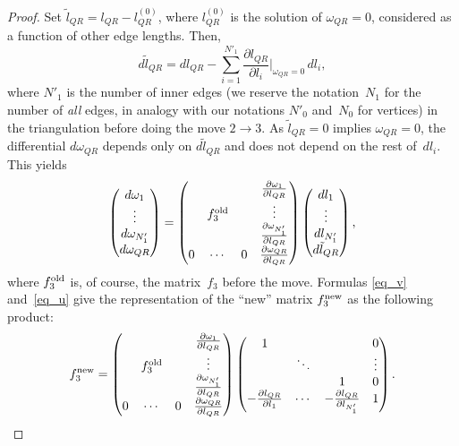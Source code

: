 \documentclass[pdftex]{sigma}
\begin{document}
\begin{proof}
Set $\tilde l_{QR} = l_{QR} - l^{(0)}_{QR}$, where $l^{(0)}_{QR}$ is the solution of $\omega_{QR} = 0$, considered as a function of other edge lengths. Then,
\begin{equation}
d\tilde l_{QR} = dl_{QR} - \sum\limits_{i=1}^{N'_1} \frac{\partial l_{QR}}{\partial l_i}{\Big|}_{\omega_{QR} = 0} \, dl_i,
\label{eq_u}
\end{equation}
where $N'_1$ is the number of inner edges (we reserve the notation~$N_1$ for the number of \emph{all} edges, in analogy with our notations $N'_0$ and~$N_0$ for vertices) in the triangulation before doing the move $2\to 3$. As $\tilde l_{QR}=0$ implies $\omega_{QR}=0$, the dif\/ferential $d\omega_{QR}$ depends only on $d\tilde l_{QR}$ and does not depend on the rest of~$dl_i$. This yields
\begin{equation}
\begin{pmatrix}
d\omega_1 \\
\vdots \\
d\omega_{N'_1} \\
d\omega_{QR}
\end{pmatrix} =
\begin{pmatrix}
{} & {} & {} & \frac{\partial\omega_1}{\partial l_{QR}} \\
{} & f_3^{\rm old} & {} & \vdots \\
{} & {} & {} & \frac{\partial\omega_{N'_1}}{\partial l_{QR}} \\
0 & \cdots & 0 & \frac{\partial\omega_{QR}}{\partial l_{QR}}
\end{pmatrix}
\begin{pmatrix}
dl_1 \\
\vdots \\
dl_{N'_1} \\
d\tilde l_{QR}
\end{pmatrix},
\label{eq_v}
\end{equation}
where $f_3^{\rm old}$ is, of course, the matrix~$f_3$ before the move. Formulas \eqref{eq_v} and~\eqref{eq_u} give the representation of the ``new'' matrix $f_3^{\rm new}$ as the following product:
\begin{equation*}
f_3^{\rm new} =
\begin{pmatrix}
{} & {} & {} & \frac{\partial\omega_1}{\partial l_{QR}} \\
{} & f_3^{\rm old} & {} & \vdots \\
{} & {} & {} & \frac{\partial\omega_{N'_1}}{\partial l_{QR}} \\
0 & \cdots & 0 & \frac{\partial\omega_{QR}}{\partial l_{QR}}
\end{pmatrix}
\begin{pmatrix}
1 & {} & {} & 0 \\
{} & \ddots & {} & \vdots \\
{} & {} & 1 & 0 \\
- \frac{\partial l_{QR}}{\partial l_1} & \cdots & - \frac{\partial l_{QR}}{\partial l_{N'_1}} & 1
\end{pmatrix}.
\end{equation*}


\end{proof}
\end{document}
